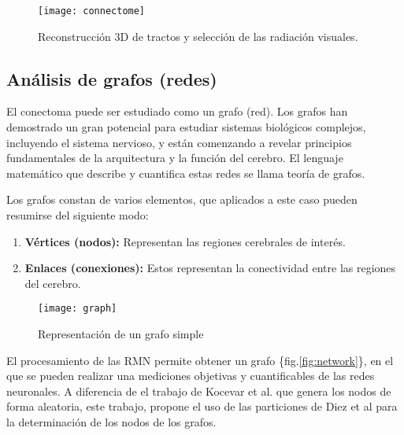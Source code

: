 \documentclass[fleqn,10pt]{UICArticle} %
\begin{document}
\begin{figure}[h]
	\centering
	\texttt{[image: connectome]}
	\caption{Reconstrucción 3D de tractos y selección de las radiación visuales.}
	\label{fig:connectome}
\end{figure}

\subsection{Análisis de grafos (redes)}

 El conectoma puede ser estudiado como un grafo (red)\cite{Fornito}. Los grafos han demostrado un gran potencial para estudiar sistemas biológicos complejos, incluyendo el sistema nervioso, y están comenzando a revelar principios fundamentales de la arquitectura y la función del cerebro. El lenguaje matemático que describe y cuantifica estas redes se llama teoría de grafos.
 
\vspace{5mm} 
Los grafos constan de varios elementos, que aplicados a este caso pueden resumirse del siguiente modo:
\begin{enumerate}[noitemsep]
\item \textbf{Vértices (nodos):} Representan las regiones cerebrales de interés.
\item \textbf{Enlaces (conexiones):} Estos representan la conectividad entre las regiones del cerebro.
\end{enumerate}

\begin{figure}[ht]
	\centering
	\texttt{[image: graph]}
	\vspace{5mm} 
	\caption{Representación de un grafo simple}
	\label{fig:graph}
\end{figure}

El procesamiento de las RMN permite obtener un grafo \{fig.\ref{fig:network}\}, en el que se pueden realizar una mediciones objetivas y cuantificables de las redes neuronales. A diferencia de el trabajo de Kocevar et al.\cite{Kocevar2016} que genera los nodos de forma aleatoria, este trabajo, propone el uso de las particiones de Diez et al \cite{Diez2015} para la determinación de los nodos de los grafos.

\begin{figure*}[b]
	\centering
	\vspace{5mm} 
	\caption{Grafo basado en las particiones de Destrieux et al.\cite{Destrieux2010}}
	\label{fig:network}
\end{figure*}
\end{document}
